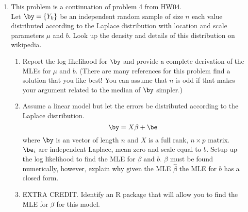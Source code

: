 \documentclass[10pt]{report}
\begin{document}
\begin{enumerate}
\item This problem is a continuation of problem 4 from HW04. \\
Let $\by = \{Y_k\}$ be an independent random sample of size $n$ each value distributed according to the Laplace distribution with location and scale parameters $\mu$ and $b$.  Look up the density and details of this distribution on wikipedia. 
\begin{enumerate}
\item Report the log likelihood for $\by$  and provide a complete derivation of the MLEs for $\mu$ and $b$.
(There are many references for this problem find a solution that you like best! You can assume that $n$ is odd if that makes your argument related to the median of $\by$ simpler.)

\item Assume a linear model but let the errors be distributed according to the  Laplace distribution.  
\[  \by = X \beta + \be \]
where $\by$ is an vector of length $n$ and $X$ is a full rank,
 $n\times p$ matrix. $\be_i$ are independent Laplace, mean zero and scale equal to $b$. 
Setup up the log likelihood  to find the MLE for $\beta$ and $b$.   $\beta$ must be found numerically, however, explain why given the MLE $\hat{\beta}$ the MLE for $b$ has a closed form. 

\item EXTRA CREDIT. Identify an R package that will allow you to find the MLE for $\beta$ for this model. 

\end{enumerate}


 \end{enumerate}
 
\end{document}
